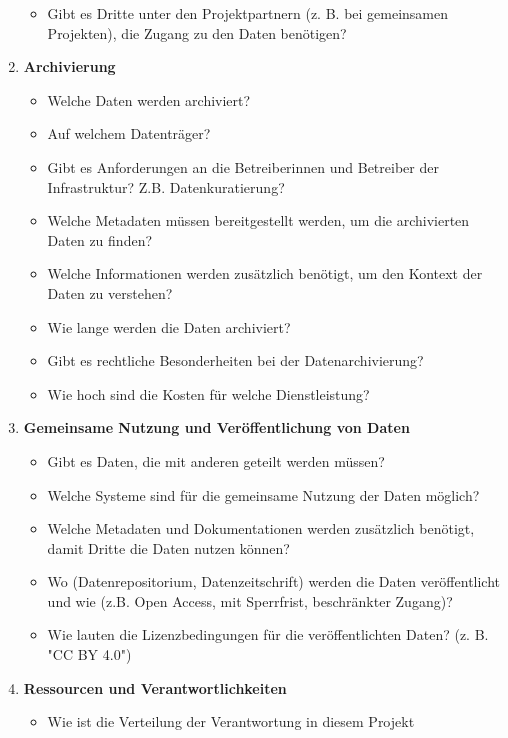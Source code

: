 \begin{enumerate}[start=0, label=\textbf{\arabic*})]
\begin{itemize}
          \item Gibt es Dritte unter den Projektpartnern (z. B. bei gemeinsamen
                Projekten), die Zugang zu den Daten benötigen?
        \end{itemize}
  \item \textbf{Archivierung}
        \begin{itemize}
          \item Welche Daten werden archiviert?
          \item Auf welchem Datenträger?
          \item Gibt es Anforderungen an die Betreiberinnen und Betreiber der Infrastruktur? Z.B.
                Datenkuratierung?
          \item Welche Metadaten müssen bereitgestellt werden, um die
                archivierten Daten zu finden?
          \item Welche Informationen werden zusätzlich benötigt, um den
                Kontext der Daten zu verstehen?
          \item Wie lange werden die Daten archiviert?
          \item Gibt es rechtliche Besonderheiten bei der Datenarchivierung?
          \item Wie hoch sind die Kosten für welche Dienstleistung?
        \end{itemize}
  \item \textbf{Gemeinsame Nutzung und Veröffentlichung von Daten}
        \begin{itemize}
          \item Gibt es Daten, die mit anderen geteilt werden müssen?
          \item Welche Systeme sind für die gemeinsame Nutzung der Daten möglich?
          \item Welche Metadaten und Dokumentationen werden zusätzlich benötigt,
                damit Dritte die Daten nutzen können?
          \item Wo (Datenrepositorium, Datenzeitschrift) werden die Daten
                veröffentlicht und wie (z.B. Open Access, mit Sperrfrist,
                beschränkter Zugang)?
          \item Wie lauten die Lizenzbedingungen für die veröffentlichten Daten?
               (z. B. "CC BY 4.0")
        \end{itemize}
  \item \textbf{Ressourcen und Verantwortlichkeiten}
        \begin{itemize}
          \item Wie ist die Verteilung der Verantwortung in diesem Projekt

\end{itemize}
\end{enumerate}
